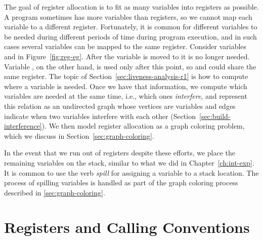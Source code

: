 \documentclass[11pt]{book}
\begin{document}
The goal of register allocation is to fit as many variables into
registers as possible. A program sometimes has more variables than
registers, so we cannot map each variable to a different
register. Fortunately, it is common for different variables to be
needed during different periods of time during program execution, and
in such cases several variables can be mapped to the same register.
Consider variables  and  in Figure~\ref{fig:reg-eg}.
After the variable  is moved to  it is no longer
needed.  Variable , on the other hand, is used only after this
point, so  and  could share the same register. The
topic of Section~\ref{sec:liveness-analysis-r1} is how to compute
where a variable is needed.  Once we have that information, we compute
which variables are needed at the same time, i.e., which ones
\emph{interfere}, and represent this relation as an undirected graph
whose vertices are variables and edges indicate when two variables
interfere with each other (Section~\ref{sec:build-interference}). We
then model register allocation as a graph coloring problem, which we
discuss in Section~\ref{sec:graph-coloring}.

In the event that we run out of registers despite these efforts, we
place the remaining variables on the stack, similar to what we did in
Chapter~\ref{ch:int-exp}. It is common to use the verb \emph{spill}
for assigning a variable to a stack location. The process of spilling
variables is handled as part of the graph coloring process described
in \ref{sec:graph-coloring}.

\section{Registers and Calling Conventions}
\label{sec:calling-conventions}
\end{document}
